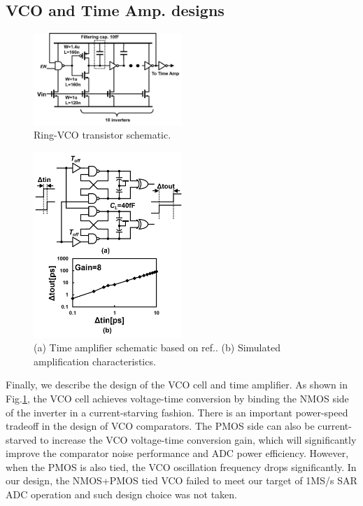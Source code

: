 \documentclass[journal]{IEEEtran}
\begin{document}
\subsection{VCO and Time Amp. designs}
\begin{figure}[!]
\centering
 \includegraphics[width=0.5\textwidth]{figs/vco_cell.png}
  \caption{Ring-VCO transistor schematic.}
  \label{cell}
\end{figure}

\begin{figure}[!]
\centering
 \includegraphics[width=0.5\textwidth]{figs/ta_chara.png}
  \caption{(a) Time amplifier schematic based on ref.\cite{timecomp}. (b) Simulated amplification characteristics.}
  \label{timeamp}
\end{figure}

Finally, we describe the design of the VCO cell and time amplifier. As shown in Fig.\ref{cell}, the VCO cell achieves voltage-time conversion by binding the NMOS side of the inverter in a current-starving fashion. 
There is an important power-speed tradeoff in the design of VCO comparators. The PMOS side can also be current-starved to increase the VCO voltage-time conversion gain\cite{shim2017edge}\cite{timecomp}, which will significantly improve the comparator noise performance and ADC power efficiency. However, when the PMOS is also tied, the VCO oscillation frequency drops significantly. In our design, the NMOS+PMOS tied VCO failed to meet our target of 1MS/s SAR ADC operation and such design choice was not taken.
\end{document}
